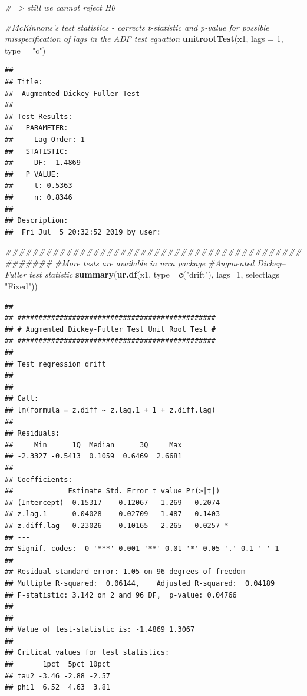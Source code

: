 \documentclass[]{book}
\newenvironment{Shaded}{\begin{snugshade}}{\end{snugshade}}
\newcommand{\CommentTok}[1]{\textcolor[rgb]{0.56,0.35,0.01}{\textit{#1}}}
\newcommand{\DataTypeTok}[1]{\textcolor[rgb]{0.13,0.29,0.53}{#1}}
\newcommand{\DecValTok}[1]{\textcolor[rgb]{0.00,0.00,0.81}{#1}}
\newcommand{\KeywordTok}[1]{\textcolor[rgb]{0.13,0.29,0.53}{\textbf{#1}}}
\newcommand{\NormalTok}[1]{#1}
\newcommand{\StringTok}[1]{\textcolor[rgb]{0.31,0.60,0.02}{#1}}
\begin{document}
\begin{Shaded}
\begin{Highlighting}[]
\CommentTok{#=> still we cannot reject H0}

\CommentTok{#McKinnons's test statistics - corrects t-statistic and p-value for possible misspecification of lags in the ADF test equation}
\KeywordTok{unitrootTest}\NormalTok{(x1, }\DataTypeTok{lags =} \DecValTok{1}\NormalTok{, }\DataTypeTok{type =} \StringTok{"c"}\NormalTok{)}
\end{Highlighting}
\end{Shaded}

\begin{verbatim}
## 
## Title:
##  Augmented Dickey-Fuller Test
## 
## Test Results:
##   PARAMETER:
##     Lag Order: 1
##   STATISTIC:
##     DF: -1.4869
##   P VALUE:
##     t: 0.5363 
##     n: 0.8346 
## 
## Description:
##  Fri Jul  5 20:32:52 2019 by user:
\end{verbatim}

\begin{Shaded}
\begin{Highlighting}[]
\CommentTok{###################################################}
\CommentTok{#More tests are available in urca package}
\CommentTok{#Augmented Dickey--Fuller test statistic}
\KeywordTok{summary}\NormalTok{(}\KeywordTok{ur.df}\NormalTok{(x1, }\DataTypeTok{type=} \KeywordTok{c}\NormalTok{(}\StringTok{"drift"}\NormalTok{), }\DataTypeTok{lags=}\DecValTok{1}\NormalTok{, }\DataTypeTok{selectlags =} \StringTok{"Fixed"}\NormalTok{))}
\end{Highlighting}
\end{Shaded}

\begin{verbatim}
## 
## ############################################### 
## # Augmented Dickey-Fuller Test Unit Root Test # 
## ############################################### 
## 
## Test regression drift 
## 
## 
## Call:
## lm(formula = z.diff ~ z.lag.1 + 1 + z.diff.lag)
## 
## Residuals:
##     Min      1Q  Median      3Q     Max 
## -2.3327 -0.5413  0.1059  0.6469  2.6681 
## 
## Coefficients:
##             Estimate Std. Error t value Pr(>|t|)  
## (Intercept)  0.15317    0.12067   1.269   0.2074  
## z.lag.1     -0.04028    0.02709  -1.487   0.1403  
## z.diff.lag   0.23026    0.10165   2.265   0.0257 *
## ---
## Signif. codes:  0 '***' 0.001 '**' 0.01 '*' 0.05 '.' 0.1 ' ' 1
## 
## Residual standard error: 1.05 on 96 degrees of freedom
## Multiple R-squared:  0.06144,    Adjusted R-squared:  0.04189 
## F-statistic: 3.142 on 2 and 96 DF,  p-value: 0.04766
## 
## 
## Value of test-statistic is: -1.4869 1.3067 
## 
## Critical values for test statistics: 
##       1pct  5pct 10pct
## tau2 -3.46 -2.88 -2.57
## phi1  6.52  4.63  3.81
\end{verbatim}
\end{document}
